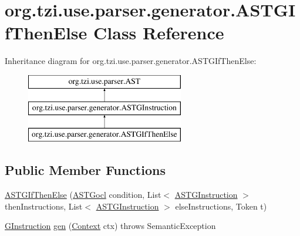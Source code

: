 \hypertarget{classorg_1_1tzi_1_1use_1_1parser_1_1generator_1_1_a_s_t_g_if_then_else}{\section{org.\-tzi.\-use.\-parser.\-generator.\-A\-S\-T\-G\-If\-Then\-Else Class Reference}
\label{classorg_1_1tzi_1_1use_1_1parser_1_1generator_1_1_a_s_t_g_if_then_else}
}
Inheritance diagram for org.\-tzi.\-use.\-parser.\-generator.\-A\-S\-T\-G\-If\-Then\-Else\-:\begin{figure}[H]
\begin{center}
\leavevmode
\includegraphics[height=3.000000cm]{classorg_1_1tzi_1_1use_1_1parser_1_1generator_1_1_a_s_t_g_if_then_else}
\end{center}
\end{figure}
\subsection*{Public Member Functions}
\begin{DoxyCompactItemize}
\item 
\hyperlink{classorg_1_1tzi_1_1use_1_1parser_1_1generator_1_1_a_s_t_g_if_then_else_a23e324802e4d10c55f8d1b5a58d063c1}{A\-S\-T\-G\-If\-Then\-Else} (\hyperlink{classorg_1_1tzi_1_1use_1_1parser_1_1generator_1_1_a_s_t_gocl}{A\-S\-T\-Gocl} condition, List$<$ \hyperlink{classorg_1_1tzi_1_1use_1_1parser_1_1generator_1_1_a_s_t_g_instruction}{A\-S\-T\-G\-Instruction} $>$ then\-Instructions, List$<$ \hyperlink{classorg_1_1tzi_1_1use_1_1parser_1_1generator_1_1_a_s_t_g_instruction}{A\-S\-T\-G\-Instruction} $>$ else\-Instructions, Token t)
\item 
\hyperlink{interfaceorg_1_1tzi_1_1use_1_1gen_1_1assl_1_1statics_1_1_g_instruction}{G\-Instruction} \hyperlink{classorg_1_1tzi_1_1use_1_1parser_1_1generator_1_1_a_s_t_g_if_then_else_a677483b81d030498b0ddf8eefd897742}{gen} (\hyperlink{classorg_1_1tzi_1_1use_1_1parser_1_1_context}{Context} ctx)  throws Semantic\-Exception 
\end{DoxyCompactItemize}


